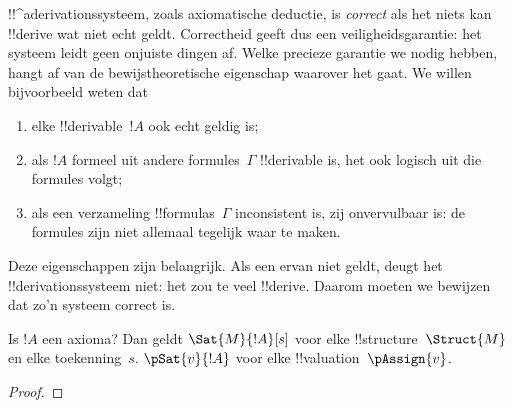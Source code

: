 \documentclass[openany]{memoir}
\begin{document}
\begingroup
\def\olfilename{OLP-0124}
\def\olfilepath{content/first-order-logic/axiomatic-deduction/}
\hypertarget{unit-OLP-0124}{}



      {}
      {}
      

\begin{explain}
!!^a{derivation}ssysteem, zoals axiomatische deductie, is
\emph{correct} als het niets kan !!{derive} wat niet echt geldt.
Correctheid geeft dus een veiligheidsgarantie: het systeem leidt geen
onjuiste dingen af. Welke precieze garantie we nodig hebben, hangt af
van de bewijstheoretische eigenschap waarover het gaat. We willen
bijvoorbeeld weten dat
\begin{enumerate}
\item elke !!{derivable}~$!A$ ook echt geldig is;
\item als $!A$ formeel uit andere formules~$\Gamma$ !!{derivable} is,
  het ook logisch uit die formules volgt;
\item als een verzameling !!{formula}s~$\Gamma$ inconsistent is, zij
  onvervulbaar is: de formules zijn niet allemaal tegelijk waar te
  maken.
\end{enumerate}
Deze eigenschappen zijn belangrijk. Als een ervan niet geldt, deugt
het !!{derivation}ssysteem niet: het zou te veel !!{derive}. Daarom
moeten we bewijzen dat zo'n systeem correct is.
\end{explain}

\begin{prop}
  Is $!A$ een axioma? Dan geldt
    {$\Sat{M}{!A}[s]$ voor elke !!{structure}~$\Struct{M}$ en elke toekenning~$s$.}
    {$\pSat{v}{!A}$ voor elke !!{valuation}~$\pAssign{v}$.}
\end{prop}

\begin{proof}
\end{proof}
\end{document}
